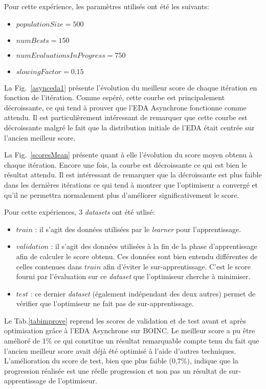 \documentclass[a4paper, 11pt]{report}
\begin{document}
Pour cette expérience, les paramètres utilisés ont été les suivants:
\begin{itemize}
\item $populationSize = 500$
\item $numBests = 150$
\item $numEvaluationsInProgress = 750$
\item $slowingFactor = 0.15$
\end{itemize}

La Fig.~\ref{asynceda1} présente l'évolution du meilleur score de chaque itération en fonction de l'itération. Comme espéré, cette courbe est principalement décroissante, ce qui tend à prouver que l'EDA Asynchrone fonctionne comme attendu. Il est particulièrement intéressant de remarquer que cette courbe est décroissante malgré le fait que la distribution initiale de l'EDA était centrée sur l'ancien meilleur score. 

La Fig.~\ref{scoresMean} présente quant à elle l'évolution du score moyen obtenu à chaque itération. Encore une fois, la courbe est décroissante ce qui est bien le résultat attendu. Il est intéressant de remarquer que la décroissante est plus faible dans les dernières itérations ce qui tend à montrer que l'optimiseur a convergé et qu'il ne permettra normalement plus d'améliorer significativement le score.

Pour cette expériences, 3 \textit{datasets} ont été utlisé:
\begin{itemize}
\item $train$ : il s'agit des données utilisées par le \textit{learner} pour l'apprentissage. 
\item $validation$ : il s'agit des données utilisées à la fin de la phase d'apprentissage afin de calculer le score obtenu. Ces données sont bien entendu différentes de celles contenues dans $train$ afin d'éviter le sur-apprentissage. C'est le score fourni par l'évaluation sur ce \textit{dataset} que l'optimiseur cherche à minimiser.
\item $test$ : ce dernier \textit{dataset} (également indépendant des deux autres) permet de vérifier que l'optimiseur ne fait pas de sur-apprentissage.
\end{itemize}
Le Tab.\ref{tabimprove} reprend les scores de validation et de test avant et après optimisation grâce à l'EDA Asynchrone sur \textsc{BOINC}. Le meilleur score a pu être amélioré de 1\% ce qui constitue un résultat remarquable compte tenu du fait que l'ancien meilleur score avait déjà été optimisé à l'aide d'autres techniques. L'amélioration du score de test, bien que plus faible (0,7\%), indique que la progression réalisée est une réelle progression et non pas un résultat de sur-apprentissage de l'optimiseur. 
\end{document}
